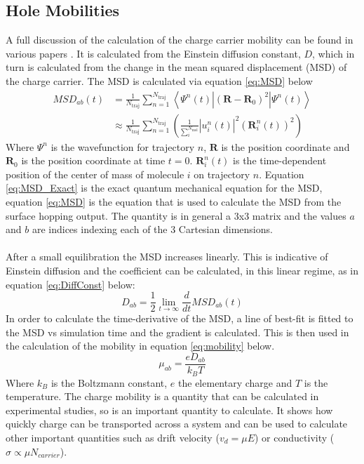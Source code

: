 \subsection{Hole Mobilities}
\label{sect:mobilities}
A full discussion of the calculation of the charge carrier mobility can be found in various papers \cite{Carof17FSSH,Giannini2018Crossover,Giannini2019}. It is calculated from the Einstein diffusion constant, $D$, which in turn is calculated from the change in the mean squared displacement (MSD) of the charge carrier. The MSD is calculated via equation \eqref{eq:MSD} below
\begin{align}
  \label{eq:MSD_Exact}
  MSD_{ab}(t) &= \frac{1}{N_{\text{traj}}} \sum_{n=1}^{N_{\text{traj}}} \left\langle \Psi^{n}(t) | (\mathbf{R} - \mathbf{R}_{0})^2 | \Psi^{n}(t) \right\rangle \\
  &\approx \frac{1}{N_{\text{traj}}} \sum_{n=1}^{N_{\text{traj}}} \left(\frac{1}{\sum_{i}^{N_{\text{mol}}}} \left| u^{n}_{i}(t) \right|^2 (\mathbf{R}_{i}^{n}(t))^2 \right)
  \label{eq:MSD}
\end{align}
Where $\Psi^{n}$ is the wavefunction for trajectory $n$, $\mathbf{R}$ is the position coordinate and $\mathbf{R}_{0}$ is the position coordinate at time $t=0$. $\mathbf{R}_{i}^{n}(t)$ is the time-dependent position of the center of mass of molecule $i$ on trajectory $n$. Equation \eqref{eq:MSD_Exact} is the exact quantum mechanical equation for the MSD, equation \eqref{eq:MSD} is the equation that is used to calculate the MSD from the surface hopping output. The quantity is in general a 3x3 matrix and the values $a$ and $b$ are indices indexing each of the 3 Cartesian dimensions.
\\\\
After a small equilibration the MSD increases linearly. This is indicative of Einstein diffusion and the coefficient can be calculated, in this linear regime, as in equation \eqref{eq:DiffConst} below:
\begin{equation}
  D_{ab} = \frac{1}{2} \lim_{t \rightarrow \infty} \frac{d}{dt}MSD_{ab}(t)
  \label{eq:DiffConst}
\end{equation}
In order to calculate the time-derivative of the MSD, a line of best-fit is fitted to the MSD vs simulation time and the gradient is calculated. This is then used in the calculation of the mobility in equation \eqref{eq:mobility} below.
\begin{equation}
	\mu_{ab} = \frac{e D_{ab}}{k_{B} T}
	\label{eq:mobility}
\end{equation}
Where $k_{B}$ is the Boltzmann constant, $e$ the elementary charge and $T$ is the temperature. The charge mobility is a quantity that can be calculated in experimental studies, so is an important quantity to calculate. It shows how quickly charge can be transported across a system and can be used to calculate other important quantities such as drift velocity ($v_{d} = \mu E$) or conductivity ($\sigma \propto \mu N_{carrier}$).
